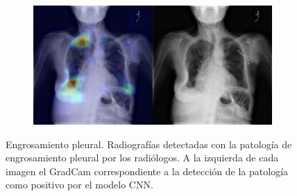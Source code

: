 \begin{figure}[b]
\begin{subfigure}{0.4\textwidth}
    \end{subfigure}
    \begin{subfigure}{0.4\textwidth}
        \centering
        \includegraphics[width=1.0\textwidth]{Chapters/5. Conclusiones/img/Pleural-Thickening/1_1_00023325_014.png}
    \end{subfigure}

    \caption{Engrosamiento pleural. Radiografías detectadas con la patología de engrosamiento pleural por los
                    radiólogos. A la izquierda de cada imagen el GradCam correspondiente a la detección
                    de la patología como positivo por el modelo CNN.}
\end{figure}

